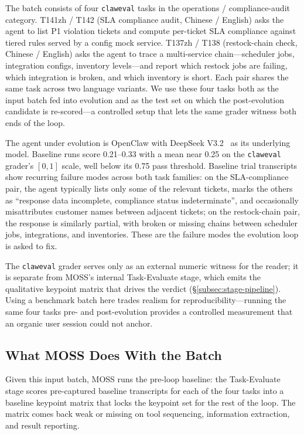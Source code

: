\documentclass{article}
\begin{document}
The batch consists of four \texttt{claweval} tasks in the operations / compliance-audit category. T141zh / T142 (SLA compliance audit, Chinese / English) asks the agent to list P1 violation tickets and compute per-ticket SLA compliance against tiered rules served by a config mock service. T137zh / T138 (restock-chain check, Chinese / English) asks the agent to trace a multi-service chain---scheduler jobs, integration configs, inventory levels---and report which restock jobs are failing, which integration is broken, and which inventory is short. Each pair shares the same task across two language variants. We use these four tasks both as the input batch fed into evolution and as the test set on which the post-evolution candidate is re-scored---a controlled setup that lets the same grader witness both ends of the loop.

The agent under evolution is OpenClaw with DeepSeek V3.2~\citep{liu2025deepseek} as its underlying model. Baseline runs score 0.21--0.33 with a mean near 0.25 on the \texttt{claweval} grader's $[0,1]$ scale, well below its 0.75 pass threshold. Baseline trial transcripts show recurring failure modes across both task families: on the SLA-compliance pair, the agent typically lists only some of the relevant tickets, marks the others as ``response data incomplete, compliance status indeterminate'', and occasionally misattributes customer names between adjacent tickets; on the restock-chain pair, the response is similarly partial, with broken or missing chains between scheduler jobs, integrations, and inventories. These are the failure modes the evolution loop is asked to fix.

The \texttt{claweval} grader serves only as an external numeric witness for the reader; it is separate from MOSS's internal Task-Evaluate stage, which emits the qualitative keypoint matrix that drives the verdict (\S\ref{subsec:stage-pipeline}). Using a benchmark batch here trades realism for reproducibility---running the same four tasks pre- and post-evolution provides a controlled measurement that an organic user session could not anchor.

\subsection{What MOSS Does With the Batch}
\label{subsec:case-diag}

Given this input batch, MOSS runs the pre-loop baseline: the Task-Evaluate stage scores pre-captured baseline transcripts for each of the four tasks into a baseline keypoint matrix that locks the keypoint set for the rest of the loop. The matrix comes back weak or missing on tool sequencing, information extraction, and result reporting.
\end{document}
